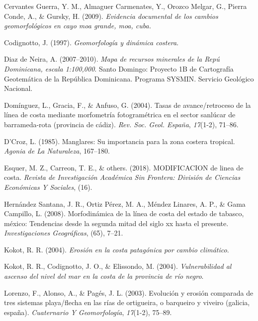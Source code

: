 \documentclass[11pt,]{article}
\begin{document}
\hypertarget{ref-cervantes2009evidencia}{}
Cervantes Guerra, Y. M., Almaguer Carmenates, Y., Orozco Melgar, G.,
Pierra Conde, A., \& Gursky, H. (2009). \emph{Evidencia documental de
los cambios geomorfológicos en cayo moa grande, moa, cuba.}

\hypertarget{ref-codignotto1997geomorfologia}{}
Codignotto, J. (1997). \emph{Geomorfología y dinámica costera}.

\hypertarget{ref-maparecursosminerales}{}
Diaz de Neira, A. (2007--2010). \emph{Mapa de recursos minerales de la
Repú Dominicana, escala 1:100,000}. Santo Domingo: Proyecto 1B de
Cartografía Geotemática de la República Dominicana. Programa SYSMIN.
Servicio Geológico Nacional.

\hypertarget{ref-dominguez2004tasas}{}
Domínguez, L., Gracia, F., \& Anfuso, G. (2004). Tasas de
avance/retroceso de la línea de costa mediante morfometría
fotogramétrica en el sector sanlúcar de barrameda-rota (provincia de
cádiz). \emph{Rev. Soc. Geol. España}, \emph{17}(1-2), 71--86.

\hypertarget{ref-d1985manglares}{}
D'Croz, L. (1985). Manglares: Su importancia para la zona costera
tropical. \emph{Agonia de La Naturaleza}, 167--180.

\hypertarget{ref-esquer2018modificacion}{}
Esquer, M. Z., Carreon, T. E., \& others. (2018). MODIFICACION de linea
de costa. \emph{Revista de Investigación Académica Sin Frontera:
División de Ciencias Económicas Y Sociales}, (16).

\hypertarget{ref-hernandez2008morfodinamica}{}
Hernández Santana, J. R., Ortiz Pérez, M. A., Méndez Linares, A. P., \&
Gama Campillo, L. (2008). Morfodinámica de la línea de costa del estado
de tabasco, méxico: Tendencias desde la segunda mitad del siglo xx hasta
el presente. \emph{Investigaciones Geográficas}, (65), 7--21.

\hypertarget{ref-kokot2004erosion}{}
Kokot, R. R. (2004). \emph{Erosión en la costa patagónica por cambio
climático}.

\hypertarget{ref-kokot2004vulnerabilidad}{}
Kokot, R. R., Codignotto, J. O., \& Elissondo, M. (2004).
\emph{Vulnerabilidad al ascenso del nivel del mar en la costa de la
provincia de río negro}.

\hypertarget{ref-lorenzo2003evolucion}{}
Lorenzo, F., Alonso, A., \& Pagés, J. L. (2003). Evolución y erosión
comparada de tres sistemas playa/flecha en las rías de ortigueira, o
barqueiro y viveiro (galicia, españa). \emph{Cuaternario Y
Geomorfología}, \emph{17}(1-2), 75--89.
\end{document}
